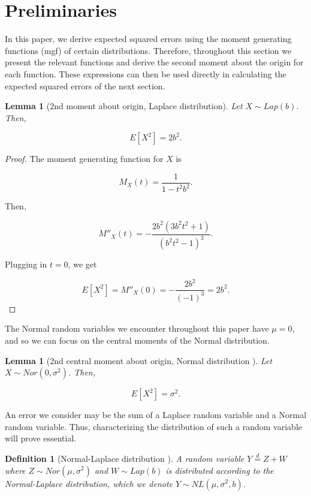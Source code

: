 \documentclass{article}
\theoremstyle{plain}
\newtheorem{lem}[thm]{Lemma}
\newtheorem{defn}[thm]{Definition}
\begin{document}
\section{Preliminaries}

In this paper, we derive expected squared errors using the moment generating functions (mgf) of certain distributions. Therefore, throughout this section we present the relevant functions and derive the second moment about the origin for each function. These expressions can then be used directly in calculating the expected squared errors of the next section. 

\begin{lem}[2nd moment about origin, Laplace distribution]
Let $X \sim Lap(b)$. Then, 

$$E[X^2] = 2b^2.$$
\end{lem}

\begin{proof}
The moment generating function for $X$ is 

$$M_X(t) = \frac{1}{1 - t^2b^2}.$$

Then,

$$M''_X(t) = -\frac{2b^2(3b^2t^2 + 1)}{(b^2t^2 - 1)^3}.$$

Plugging in $t = 0$, we get 

$$E[X^2] = M''_X(0) = -\frac{2b^2}{(-1)^3} = 2b^2.$$
\end{proof}

The Normal random variables we encounter throughout this paper have $\mu = 0$, and so we can focus on the central moments of the Normal distribution.

\begin{lem}[2nd central moment about origin, Normal distribution \cite{papoulis2002probability}]
Let $X \sim Nor(0, \sigma^2)$. Then,

$$E[X^2] = \sigma^2.$$
\end{lem}

An error we consider may be the sum of a Laplace random variable and a Normal random variable. Thus, characterizing the distribution of such a random variable will prove essential.

\begin{defn}[Normal-Laplace distribution \cite{Reed2006}]
A random variable $Y \overset{d}{=} Z + W$ where $Z \sim Nor(\mu, \sigma^2)$ and $W \sim Lap(b)$ is distributed according to the Normal-Laplace distribution, which we denote $Y \sim NL(\mu, \sigma^2, b)$.
\end{defn}
\end{document}

